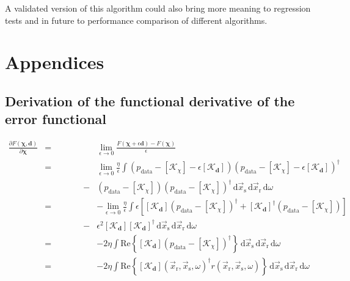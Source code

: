 \documentclass[10pt,a4paper]{article}
\newcommand{\partder}[2]{\ensuremath{\frac{\partial #1}{\partial #2}}}
\newcommand{\df}[1]{\, \ensuremath{\mbox{d}#1}}
\newcommand{\real}[1]{\text{Re} \left\{ #1 \right\}}
\newcommand{\xs}{\vec{x}_\text{s}}
\newcommand{\xr}{\vec{x}_\text{r}}
\begin{document}
{A validated version of this algorithm could also bring more meaning to regression tests and in future to performance comparison of different algorithms.


\appendix
\section{Appendices}
\subsection{Derivation of the functional derivative of the error functional}
\label{deriveerrorfunctional}
\begin{eqnarray*}
\partder{F(\mathbf{\chi}, \mathbf{d})}{\mathbf{\chi}} & = &
\lim_{\epsilon \rightarrow 0} \frac{F(\mathbf{\chi} + \epsilon
\mathbf{d}) - F(\mathbf{\chi})}{\epsilon} \\
& = & \lim_{\epsilon \rightarrow 0} \frac{\eta}{\epsilon} \int
\left(p_{\text{data}} - \left[\mathcal{K}_\chi \right] - \epsilon
\left[\mathcal{K}_\mathbf{d} \right] \right) \left(p_{\text{data}} -
\left[\mathcal{K}_\chi \right] - \epsilon \left[\mathcal{K}_\mathbf{d}
\right] \right)^{\dagger}\\
& \, \, \, \, \, \, \, \, \, \, \, \, \, \, \, \, \, \, \, \, \, \, \,
\, \, \, \, - & \left(p_{\text{data}} - \left[\mathcal{K}_\chi \right]
\right) \left(p_{\text{data}} - \left[\mathcal{K}_\chi \right]
\right)^{\dagger} \df{\xs} \df{\xr} \df{\omega} \\
& = & -\lim_{\epsilon \rightarrow 0} \frac{\eta}{\epsilon} \int
\epsilon \left[ \left[\mathcal{K}_\mathbf{d} \right]
\left(p_{\text{data}} - \left[\mathcal{K}_\chi \right]
\right)^{\dagger} + \left[\mathcal{K}_\mathbf{d} \right]^{\dagger}
\left(p_{\text{data}} - \left[\mathcal{K}_\chi \right] \right) \right]
\\
& \, \, \, \, \, \, \, \, \, \, \, \, \, \, \, \, \, \, \, \, \, \, \,
\, \, \, \, - & \epsilon^2 \left[\mathcal{K}_\mathbf{d} \right]
\left[\mathcal{K}_\mathbf{d} \right]^{\dagger} \df{\xs} \df{\xr}
\df{\omega} \\
& = & -2 \eta \int \real{\left[\mathcal{K}_\mathbf{d} \right]
\left(p_{\text{data}} - \left[\mathcal{K}_\chi \right]
\right)^{\dagger}} \df{\xs} \df{\xr} \df{\omega} \\
& = & -2 \eta \int \real{\left[\mathcal{K}_\mathbf{d} \right](\xr,
\xs, \omega)^{\dagger} r (\xr, \xs, \omega)} \df{\xs} \df{\xr}
\df{\omega}
\end{eqnarray*}

}
\end{document}
